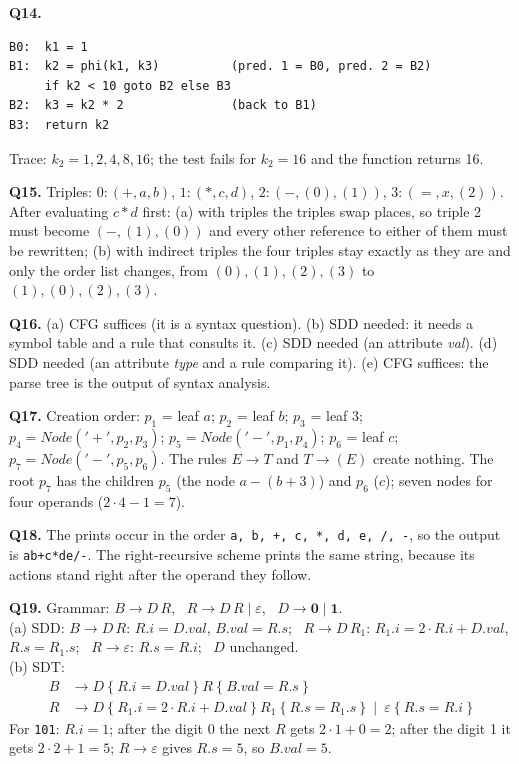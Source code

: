 \documentclass[11pt,a4paper]{article}
\newcommand{\at}[2]{\ensuremath{#1.\mathit{#2}}}
\newcommand{\tok}[1]{\ensuremath{\mathtt{#1}}}
\begin{document}
\textbf{Q14.}
\begin{lstlisting}
B0:  k1 = 1
B1:  k2 = phi(k1, k3)          (pred. 1 = B0, pred. 2 = B2)
     if k2 < 10 goto B2 else B3
B2:  k3 = k2 * 2               (back to B1)
B3:  return k2
\end{lstlisting}
Trace: $k_2=1,2,4,8,16$; the test fails for $k_2=16$ and the function returns 16.

\textbf{Q15.} Triples: $0:(+,a,b)$, $1:(*,c,d)$, $2:(-,(0),(1))$, $3:(=,x,(2))$. After evaluating $c*d$ first: (a) with triples the triples swap places, so triple 2 must become $(-,(1),(0))$ and every other reference to either of them must be rewritten; (b) with indirect triples the four triples stay exactly as they are and only the order list changes, from $(0),(1),(2),(3)$ to $(1),(0),(2),(3)$.

\textbf{Q16.} (a) CFG suffices (it is a syntax question). (b) SDD needed: it needs a symbol table and a rule that consults it. (c) SDD needed (an attribute \textit{val}). (d) SDD needed (an attribute \textit{type} and a rule comparing it). (e) CFG suffices: the parse tree is the output of syntax analysis.

\textbf{Q17.} Creation order: $p_1$ = leaf $a$; $p_2$ = leaf $b$; $p_3$ = leaf $3$; $p_4=\mathit{Node}(\tok{'+'},p_2,p_3)$; $p_5=\mathit{Node}(\tok{'-'},p_1,p_4)$; $p_6$ = leaf $c$; $p_7=\mathit{Node}(\tok{'-'},p_5,p_6)$. The rules $E\to T$ and $T\to(E)$ create nothing. The root $p_7$ has the children $p_5$ (the node $a-(b+3)$) and $p_6$ ($c$); seven nodes for four operands ($2\cdot4-1=7$).

\textbf{Q18.} The prints occur in the order \texttt{a, b, +, c, *, d, e, /, -}, so the output is \texttt{ab+c*de/-}. The right-recursive scheme prints the same string, because its actions stand right after the operand they follow.

\textbf{Q19.} Grammar: $B\to D\,R$, \ $R\to D\,R\mid\varepsilon$, \ $D\to\mathbf{0}\mid\mathbf{1}$.\\
(a) SDD: $B\to D\,R$: $\at{R}{i}=\at{D}{val}$, $\at{B}{val}=\at{R}{s}$; \ $R\to D\,R_1$: $\at{R_1}{i}=2\cdot\at{R}{i}+\at{D}{val}$, $\at{R}{s}=\at{R_1}{s}$; \ $R\to\varepsilon$: $\at{R}{s}=\at{R}{i}$; \ $D$ unchanged.\\
(b) SDT:
\begin{align*}
B &\to D\ \{\ \at{R}{i}=\at{D}{val}\ \}\ R\ \{\ \at{B}{val}=\at{R}{s}\ \}\\
R &\to D\ \{\ \at{R_1}{i}=2\cdot\at{R}{i}+\at{D}{val}\ \}\ R_1\ \{\ \at{R}{s}=\at{R_1}{s}\ \}\ \mid\ \varepsilon\ \{\ \at{R}{s}=\at{R}{i}\ \}
\end{align*}
For \texttt{101}: $R.i=1$; after the digit 0 the next $R$ gets $2\cdot1+0=2$; after the digit 1 it gets $2\cdot2+1=5$; $R\to\varepsilon$ gives $R.s=5$, so $B.val=5$.
\end{document}
